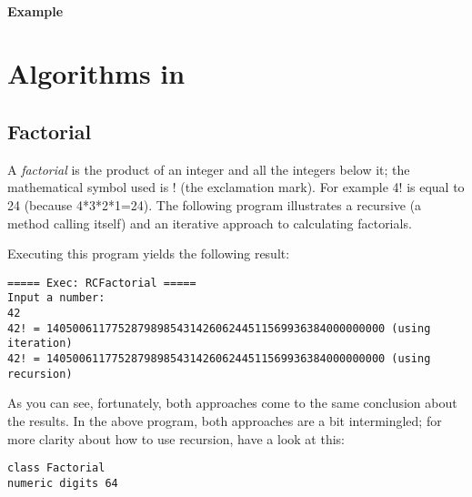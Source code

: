 {\subsubsection{Example}







\chapter{Algorithms in \nr}{}
\section{Factorial}
A \emph{factorial} is the product of an integer and all the integers
below it; the mathematical symbol used is ! (the exclamation mark). For
example 4! is equal to 24 (because 4*3*2*1=24). The
following program illustrates a recursive (a method calling itself)
and an iterative approach to calculating factorials.

Executing this program yields the following result:
\begin{verbatim}
===== Exec: RCFactorial =====
Input a number: 
42
42! = 1405006117752879898543142606244511569936384000000000 (using iteration)
42! = 1405006117752879898543142606244511569936384000000000 (using recursion)
\end{verbatim}
As you can see, fortunately, both approaches come to the same
conclusion about the results. In the above program, both
approaches are a bit intermingled; for more clarity about how to use
recursion, have a look at this:
\begin{lstlisting}[label=factorialrecursive, caption=Factorial Recursive]
class Factorial
numeric digits 64


\end{lstlisting}}
